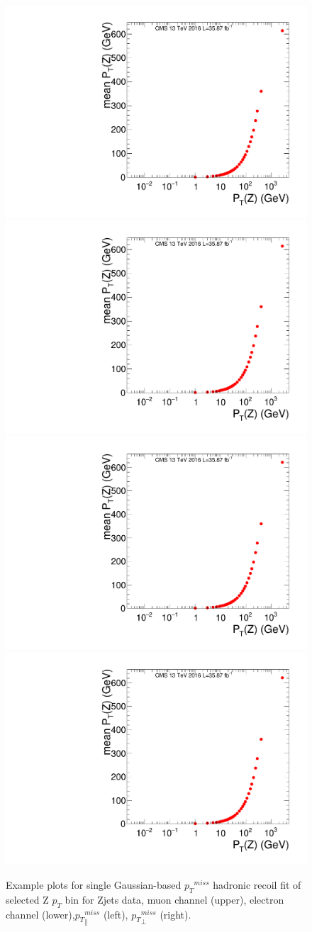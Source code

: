 \begin{figure}[htbp]
\begin{center}
\includegraphics[width=0.46\linewidth, page=21]{figures/SingleEMU_Run2016Full_03Feb2017_allcorV2_met_para_study_ZSelecLowLPt_mu.pdf}
\includegraphics[width=0.46\linewidth, page=56]{figures/SingleEMU_Run2016Full_03Feb2017_allcorV2_met_para_study_ZSelecLowLPt_mu.pdf}
\includegraphics[width=0.46\linewidth, page=21]{figures/SingleEMU_Run2016Full_03Feb2017_allcorV2_met_para_study_ZSelecLowLPt_el.pdf}
\includegraphics[width=0.46\linewidth, page=56]{figures/SingleEMU_Run2016Full_03Feb2017_allcorV2_met_para_study_ZSelecLowLPt_el.pdf}
\caption{Example plots for single Gaussian-based ${p_{T}}^{miss}$ hadronic recoil fit of selected Z $p_T$ bin for Zjets data, muon channel (upper), electron channel (lower),${p_{T}}^{miss}_\parallel$ (left), ${p_{T}}^{miss}_\perp$ (right).}
\label{fig:recoilfit_example_data}
\end{center}
\end{figure}


